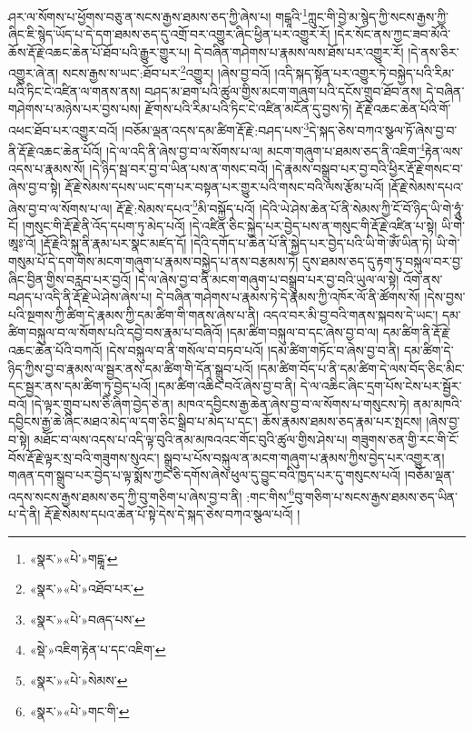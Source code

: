 ཤར་ལ་སོགས་པ་ཕྱོགས་བཅུ་ན་སངས་རྒྱས་ཐམས་ཅད་ཀྱི་ཞེས་པ། གངྒཱའི་\footnote{«སྣར་»«པེ་»གངྒཱ་}ཀླུང་གི་བྱེ་མ་སྙེད་ཀྱི་སངས་རྒྱས་ཀྱི་ཞིང་ཇི་སྙེད་ཡོད་པ་དེ་དག་ཐམས་ཅད་དུ་འགྲོ་བར་འགྱུར་ཞིང་ཕྱིན་པར་འགྱུར་རོ། །དེར་སོང་ནས་ཀྱང་ཟབ་མོའི་ཆོས་རྡོ་རྗེ་འཆང་ཆེན་པོ་ཐོབ་པའི་རྒྱུར་གྱུར་པ། དེ་བཞིན་གཤེགས་པ་རྣམས་ལས་ཐོས་པར་འགྱུར་རོ། །དེ་ནས་ཅིར་འགྱུར་ཞེ་ན། སངས་རྒྱས་ས་ཡང་:ཐོབ་པར་\footnote{«སྣར་»«པེ་»འཐོབ་པར་}འགྱུར། །ཞེས་བྱ་བའོ། །འདི་སྐད་སྟོན་པར་འགྱུར་ཏེ་བསྐྱེད་པའི་རིམ་པའི་ཏིང་ངེ་འཛིན་ལ་གནས་ནས། བཤད་མ་ཐག་པའི་ཚུལ་གྱིས་མངག་གཞུག་པའི་དངོས་གྲུབ་ཐོབ་ནས། དེ་བཞིན་གཤེགས་པ་མཉེས་པར་བྱས་པས། རྫོགས་པའི་རིམ་པའི་ཏིང་ངེ་འཛིན་མངོན་དུ་བྱས་ཏེ། རྡོ་རྗེ་འཆང་ཆེན་པོའི་གོ་འཕང་ཐོབ་པར་འགྱུར་བའོ། །བཅོམ་ལྡན་འདས་དམ་ཚིག་རྡོ་རྗེ་:བཤད་པས་\footnote{«སྣར་»«པེ་»བཞད་པས་}དེ་སྐད་ཅེས་བཀའ་སྩལ་ཏོ་ཞེས་བྱ་བ་ནི་རྡོ་རྗེ་འཆང་ཆེན་པོའོ། །དེ་ལ་འདི་ནི་ཞེས་བྱ་བ་ལ་སོགས་པ་ལ། མངག་གཞུག་པ་ཐམས་ཅད་ནི་འཇིག་\footnote{«སྡེ་»འཇིག་རྟེན་པ་དང་འཇིག་}རྟེན་ལས་འདས་པ་རྣམས་སོ། །དེ་ཉིད་སྦ་བར་བྱ་བ་ཡིན་པས་ན་གསང་བའོ། །དེ་རྣམས་བསྒྲུབ་པར་བྱ་བའི་ཕྱིར་རྡོ་རྗེ་གསང་བ་ཞེས་བྱ་བ་སྟེ། རྡོ་རྗེ་སེམས་དཔས་ཡང་དག་པར་བསྟན་པར་གྱུར་པའི་གསང་བའི་ལས་རྩོམ་པའོ། །རྡོ་རྗེ་སེམས་དཔའ་ཞེས་བྱ་བ་ལ་སོགས་པ་ལ། རྡོ་རྗེ་:སེམས་དཔའ་\footnote{«སྣར་»«པེ་»སེམས་}མི་བསྐྱོད་པའོ། །དེའི་ཡེ་ཤེས་ཆེན་པོ་ནི་སེམས་ཀྱི་ངོ་བོ་ཉིད་ཡི་གེ་ཧཱུཾ་ངོ། །གསུང་གི་རྡོ་རྗེ་ནི་འོད་དཔག་ཏུ་མེད་པའོ། །དེ་འཛིན་ཅིང་སྐྱེད་པར་བྱེད་པས་ན་གསུང་གི་རྡོ་རྗེ་འཛིན་པ་སྟེ། ཡི་གེ་ཨཱཿ་འོ། །རྡོ་རྗེའི་སྐུ་ནི་རྣམ་པར་སྣང་མཛད་དོ། །དེའི་དགོད་པ་ཆེན་པོ་ནི་སྐྱེད་པར་བྱེད་པའི་ཡི་གེ་ཨོཾ་ཡིན་ཏེ། ཡི་གེ་གསུམ་པོ་དེ་དག་གིས་མངག་གཞུག་པ་རྣམས་བསྐྱེད་པ་ནས་བརྩམས་ཏེ། དུས་ཐམས་ཅད་དུ་རྟག་ཏུ་བསྐུལ་བར་བྱ་ཞིང་བྱིན་གྱིས་བརླབ་པར་བྱའོ། །དེ་ལ་ཞེས་བྱ་བ་ནི་མངག་གཞུག་པ་བསྒྲུབ་པར་བྱ་བའི་ཡུལ་ལ་སྟེ། འོག་ནས་བཤད་པ་འདི་ནི་རྡོ་རྗེ་ཡེ་ཤེས་ཞེས་པ། དེ་བཞིན་གཤེགས་པ་རྣམས་ཏེ་དེ་རྣམས་ཀྱི་འཁོར་ལོ་ནི་ཚོགས་སོ། །དེས་བྱས་པའི་སྔགས་ཀྱི་ཚིག་དེ་རྣམས་ཀྱི་དམ་ཚིག་གི་གནས་ཞེས་པ་ནི། འདའ་བར་མི་བྱ་བའི་གནས་སྐབས་དེ་ཡང་། དམ་ཚིག་བསྐུལ་བ་ལ་སོགས་པའི་དབྱེ་བས་རྣམ་པ་བཞིའོ། །དམ་ཚིག་བསྐུལ་བ་དང་ཞེས་བྱ་བ་ལ། དམ་ཚིག་ནི་རྡོ་རྗེ་འཆང་ཆེན་པོའི་བཀའོ། །དེས་བསྐུལ་བ་ནི་གསོལ་བ་བཏབ་པའོ། །དམ་ཚིག་གཏོང་བ་ཞེས་བྱ་བ་ནི། དམ་ཚིག་དེ་ཉིད་ཀྱིས་བྱ་བ་རྣམས་ལ་སྦྱར་ནས་དམ་ཚིག་གི་དོན་སྒྲུབ་པའོ། །དམ་ཚིག་བོད་པ་ནི་དམ་ཚིག་དེ་ལས་བོད་ཅིང་མིང་དང་སྦྱར་ནས་དམ་ཚིག་ཏུ་བྱེད་པའོ། །དམ་ཚིག་འཆིང་བའོ་ཞེས་བྱ་བ་ནི། དེ་ལ་འཆིང་ཞིང་དྲག་པོས་ངེས་པར་སྦྱོར་བའོ། །དེ་ལྟར་གྲུབ་པས་ཅི་ཞིག་བྱེད་ཅེ་ན། མཁའ་དབྱིངས་རྒྱ་ཆེན་ཞེས་བྱ་བ་ལ་སོགས་པ་གསུངས་ཏེ། ནམ་མཁའི་དབྱིངས་རྒྱ་ཆེ་ཞིང་མཐའ་མེད་ལ་དག་ཅིང་སྒྲིབ་པ་མེད་པ་དང་། ཆོས་རྣམས་ཐམས་ཅད་རྣམ་པར་སྤངས། །ཞེས་བྱ་བ་སྟེ། མཐོང་བ་ལས་འདས་པ་འདི་ལྟ་བུའི་ནམ་མཁའའང་གོང་བུའི་ཚུལ་གྱིས་ཤེས་པ། གཟུགས་ཅན་གྱི་རང་གི་ངོ་བོས་རྡོ་རྗེ་ལྟར་སྲ་བའི་གཟུགས་སུའང་། སྒྲུབ་པ་པོས་བསྐུལ་ན་མངག་གཞུག་པ་རྣམས་ཀྱིས་བྱེད་པར་འགྱུར་ན། གཞན་དག་སྒྲུབ་པར་བྱེད་པ་ལྟ་སྨོས་ཀྱང་ཅི་དགོས་ཞེས་ཕུལ་དུ་བྱུང་བའི་ཁྱད་པར་དུ་གསུངས་པའོ། །བཅོམ་ལྡན་འདས་སངས་རྒྱས་ཐམས་ཅད་ཀྱི་བུ་གཅིག་པ་ཞེས་བྱ་བ་ནི། :གང་གིས་\footnote{«སྣར་»«པེ་»གང་གི་}བུ་གཅིག་པ་སངས་རྒྱས་ཐམས་ཅད་ཡིན་པ་དེ་ནི། རྡོ་རྗེ་སེམས་དཔའ་ཆེན་པོ་སྟེ་དེས་དེ་སྐད་ཅེས་བཀའ་སྩལ་པའོ། །
